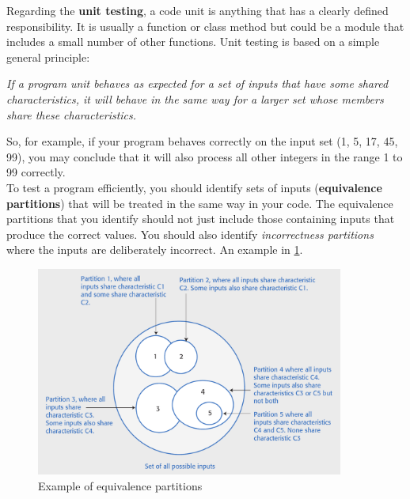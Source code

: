 \documentclass[10pt,a4paper]{report}
\begin{document}
Regarding the \textbf{unit testing},  a code unit is anything that has a clearly defined responsibility. It is
usually a function or class method but could be a module that includes a
small number of other functions. Unit testing is based on a simple general principle:
\begin{center}
	\textit{If a program unit behaves as expected for a set of inputs that have some shared
		characteristics, it will behave in the same way for a larger set whose members share
		these characteristics.}
\end{center}
So, for example, if your program behaves correctly on the input set (1, 5, 17, 45, 99), you may conclude that it will also process all other integers in the range 1 to 99 correctly.\\
To test a program efficiently, you should identify sets of inputs (\textbf{equivalence partitions}) that will be treated in the same way in your code. The equivalence partitions that you identify should not just include those containing inputs that produce the correct values. You should also identify \textit{incorrectness partitions} where the inputs are deliberately incorrect. An example in \ref{image105}. 
\begin{figure}[h]
	\centering
	\includegraphics[width=0.9\textwidth]{image105}
	\caption{Example of equivalence partitions}
	\label{image105}
\end{figure} 
\end{document}
